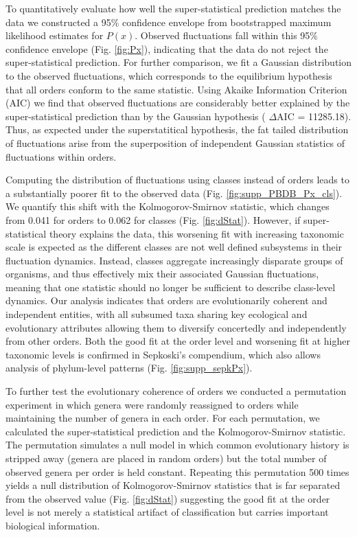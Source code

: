 \documentclass[12pt]{article}
\begin{document}
To quantitatively evaluate how well the super-statistical prediction
matches the data we constructed a 95\% confidence envelope from
bootstrapped maximum likelihood estimates for $P(x)$. Observed
fluctuations fall within this 95\% confidence envelope
(Fig. \ref{fig:Px}), indicating that the data do not reject the
super-statistical prediction. For further comparison, we fit a
Gaussian distribution to the observed fluctuations, which corresponds
to the equilibrium hypothesis that all orders conform to the same
statistic. Using Akaike Information Criterion (AIC) we find that
observed fluctuations are considerably better explained by the
super-statistical prediction than by the Gaussian hypothesis ({\small
  $\Delta$}AIC = 11285.18). Thus, as expected under the
superstatitical hypothesis, the fat tailed distribution of
fluctuations arise from the superposition of independent Gaussian
statistics of fluctuations within orders.

Computing the distribution of fluctuations using classes instead of
orders leads to a substantially poorer fit to the observed data
(Fig. \ref{fig:supp_PBDB_Px_cls}). We quantify this shift with the
Kolmogorov-Smirnov statistic, which changes from 0.041 for orders to
0.062 for classes (Fig. \ref{fig:dStat}). However, if super-statistical
theory explains the data, this worsening fit with increasing taxonomic
scale is expected as the different classes are not well defined
subsystems in their fluctuation dynamics. Instead, classes aggregate
increasingly disparate groups of organisms, and thus effectively mix
their associated Gaussian fluctuations, meaning that one statistic
should no longer be sufficient to describe class-level dynamics. Our
analysis indicates that orders are evolutionarily coherent and
independent entities, with all subsumed taxa sharing key ecological
and evolutionary attributes allowing them to diversify concertedly and
independently from other orders. Both the good fit at the order level
and worsening fit at higher taxonomic levels is confirmed in
Sepkoski's compendium, which also allows analysis of phylum-level
patterns (Fig. \ref{fig:supp_sepkPx}).

To further test the evolutionary coherence of orders we conducted a
permutation experiment in which genera were randomly reassigned to
orders while maintaining the number of genera in each order. For each
permutation, we calculated the super-statistical prediction and the
Kolmogorov-Smirnov statistic. The permutation simulates a null model
in which common evolutionary history is stripped away (genera are
placed in random orders) but the total number of observed genera per
order is held constant.  Repeating this permutation 500 times yields a
null distribution of Kolmogorov-Smirnov statistics that is far
separated from the observed value (Fig. \ref{fig:dStat}) suggesting
the good fit at the order level is not merely a statistical artifact
of classification but carries important biological information.
\end{document}
